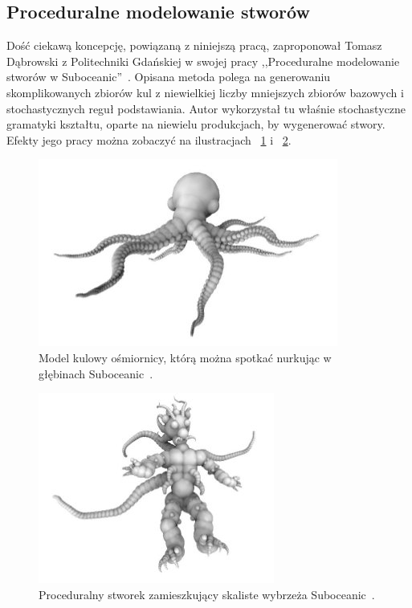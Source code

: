 \subsection{Proceduralne modelowanie stworów}
Dość ciekawą koncepcję, powiązaną z niniejszą pracą, zaproponował Tomasz
Dąbrowski z Politechniki Gdańskiej w swojej pracy ,,Proceduralne modelowanie
stworów w Suboceanic''~\cite{dabrowski}. Opisana metoda polega na generowaniu
skomplikowanych zbiorów kul z niewielkiej liczby mniejszych zbiorów bazowych i
stochastycznych reguł podstawiania. Autor wykorzystał tu właśnie stochastyczne 
gramatyki kształtu, oparte na niewielu produkcjach, by wygenerować stwory.
Efekty jego pracy można zobaczyć na ilustracjach ~\ref{multiview} i
~\ref{multiview1}.

\begin{figure}[h!]
  \centering
  \includegraphics{images/suboceanic01.jpg}
  \caption{Model kulowy ośmiornicy, którą można spotkać nurkując w głębinach
  Suboceanic~\cite{dabrowski}.}
  \label{multiview}
\end{figure}

\begin{figure}[h!]
  \centering
  \includegraphics{images/suboceanic02.jpg}
  \caption{Proceduralny stworek zamieszkujący skaliste wybrzeża
  Suboceanic~\cite{dabrowski}.}
  \label{multiview1}
\end{figure}

